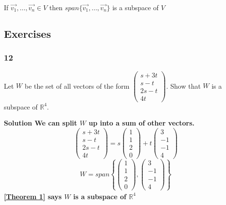     \begin{theorem} \label{Theorem 1}
      If $ \vec{v_1}, \dots, \vec{v_n} ∈ V$ then $ span\{\vec{v_1}, \dots, \vec{v_n}\} $ is a subspace of $ V $ 
    \end{theorem}

  \subsection*{Exercises}
    \subsubsection*{12}

    Let $ W $ be the set of all vectors of the form $   \begin{pmatrix}
         s + 3t   \\ 
         s - t \\ 
         2s - t \\
         4t
      \end{pmatrix} $. 
    Show that $ W $ is a subspace of $ \mathbb R^{4} $. \newline \newline 

    \bf{Solution} \newline \newline 
    We can split $ W $ up into a sum of other vectors. 
    $$
        \begin{pmatrix}
          s + 3t   \\ 
          s - t \\ 
          2s - t \\
          4t
        \end{pmatrix} = 
     s   \begin{pmatrix}
          1  \\ 
          1  \\ 
          2  \\
          0  
       \end{pmatrix} + 
    t   \begin{pmatrix}
         3  \\ 
         -1  \\ 
         -1  \\
         4  
      \end{pmatrix}
    $$
    \[
    W = span \left\{
      \begin{pmatrix}
        1  \\ 
        1  \\ 
        2  \\
        0  
     \end{pmatrix} , 
     \begin{pmatrix}
       3  \\ 
       -1  \\ 
       -1  \\
       4  
    \end{pmatrix}
    \right\}_{}^{} 
    \]
    \cref{Theorem 1} says $ W $ is a subspace of $ \mathbb R^{4} $
    
